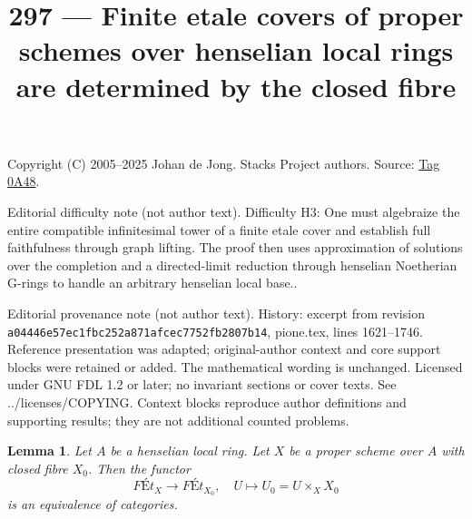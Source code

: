 \documentclass{amsart}
\theoremstyle{plain}
\newtheorem{lemma}[subsection]{Lemma}
\theoremstyle{definition}
\theoremstyle{remark}
\numberwithin{equation}{subsection}
\begin{document}
\title[Stacks Project, Tag 0A48]{297 --- Finite etale covers of proper schemes over henselian local rings are determined by the closed fibre}
\maketitle
\noindent Copyright (C) 2005--2025 Johan de Jong. Stacks Project authors. Source: \href{https://stacks.math.columbia.edu/tag/0A48}{Tag 0A48}.

\noindent Editorial difficulty note (not author text). Difficulty H3: One must algebraize the entire compatible infinitesimal tower of a finite etale cover and establish full faithfulness through graph lifting. The proof then uses approximation of solutions over the completion and a directed-limit reduction through henselian Noetherian G-rings to handle an arbitrary henselian local base..

\noindent Editorial provenance note (not author text). History: excerpt from revision \texttt{a0444\allowbreak 6e57e\allowbreak c1fbc\allowbreak 252a8\allowbreak 71afc\allowbreak ec775\allowbreak 2fb28\allowbreak 07b14}, pione.tex, lines 1621--1746. Reference presentation was adapted; original-author context and core support blocks were retained or added. The mathematical wording is unchanged. Licensed under GNU FDL 1.2 or later; no invariant sections or cover texts. See ../licenses/COPYING. Context blocks reproduce author definitions and supporting results; they are not additional counted problems.

\begin{lemma}
\label{lemma-finite-etale-on-proper-over-henselian}
Let $A$ be a henselian local ring. Let $X$ be a proper scheme over $A$
with closed fibre $X_0$. Then the functor
$$
\textit{F\'Et}_X \to \textit{F\'Et}_{X_0},\quad
U \longmapsto U_0 = U \times_X X_0
$$
is an equivalence of categories.
\end{lemma}
\end{document}
